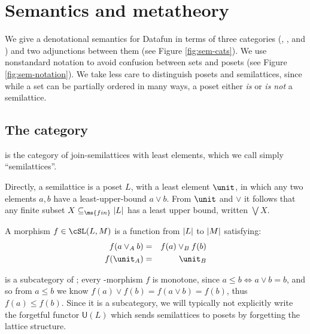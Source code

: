 
\section{Semantics and metatheory}
\label{sec:semantics}


We give a denotational semantics for Datafun in terms of three categories
(\cSet{}, \cPoset{}, and \cSL{}) and two adjunctions between them (see Figure
\ref{fig:sem-cats}). We use nonstandard notation to avoid confusion between sets
and posets (see Figure \ref{fig:sem-notation}). We take less care to distinguish
posets and semilattices, since while a set can be partially ordered in many
ways, a poset either \emph{is} or \emph{is not} a semilattice.

\subsection{The category \cSL{}}

\cSL{} is the category of join-semilattices with least elements, which we call
simply ``semilattices''.

Directly, a semilattice is a poset $L$, with a least element $\unit$, in which
any two elements $a,b$ have a least-upper-bound $a \vee b$. From $\unit$ and
$\vee$ it follows that any finite subset $X \subseteq_{\ms{fin}} \U{L}$ has a
least upper bound, written $\bigvee X$.

A morphism $f \in \cSL(L, M)$ is a function from $|L|$ to $|M|$ satisfying:
\begin{eqnarray*}
  f(a \vee_A b) &=& f(a) \vee_B f(b)\\
  f(\unit_A) &=& \unit_B
\end{eqnarray*}

\cSL{} is a subcategory of ; every \cSL{}-morphism $f$ is monotone,
since $a \le b \iff a \vee b = b$, and so from $a \le b$ we know $f(a) \vee f(b)
= f(a \vee b) = f(b)$, thus $f(a) \le f(b)$. Since it is a subcategory, we will
typically not explicitly write the forgetful functor $\mathsf{U}(L)$ which sends
semilattices to posets by forgetting the lattice structure.


